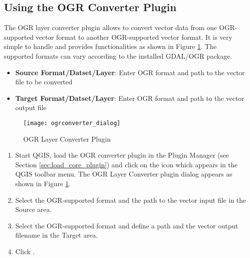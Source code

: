 \subsection{Using the OGR Converter Plugin}


The OGR layer converter plugin allows to convert vector data from one OGR-supported 
vector format to another OGR-supported vector format. It is very simple to handle and 
provides functionalities as shown in Figure \ref{fig:ogrconverter_dialog}. The 
supported formats can vary according to the installed GDAL/OGR package.

\begin{itemize}
\item \textbf{Source Format/Datset/Layer}: Enter OGR format and path to the vector file to be converted
\item \textbf{Target Format/Datset/Layer}: Enter OGR format and path to the vector output file
\end{itemize}

\begin{figure}[ht]
   \begin{center}
   \caption{OGR Layer Converter Plugin \nixcaption}\label{fig:ogrconverter_dialog}\smallskip
   \texttt{[image: ogrconverter\_dialog]}
\end{center}  
\end{figure}

\begin{enumerate}
  \item Start QGIS, load the OGR converter plugin in the Plugin Manager (see Section 
  \ref{sec:load_core_plugin}) and click on the  
  icon which appears in the QGIS toolbar menu. The OGR Layer Converter plugin dialog appears as shown in Figure \ref{fig:ogrconverter_dialog}.
  \item Select the OGR-supported format  and the path to the vector input file  in the Source area.
  \item Select the OGR-supported format  and define a path and the vector output filename  in the Target area.
  \item Click .
\end{enumerate}

\newpage




